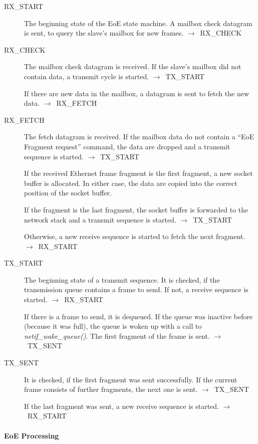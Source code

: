 \documentclass[a4paper,12pt,BCOR=6mm,bibtotoc,idxtotoc]{scrbook}
\begin{document}
\begin{description}
\item[RX\_START] The beginning state of the EoE state machine. A
  mailbox check datagram is sent, to query the slave's mailbox for new
  frames. $\rightarrow$~RX\_CHECK

\item[RX\_CHECK] The mailbox check datagram is received. If the
  slave's mailbox did not contain data, a transmit cycle is started.
  $\rightarrow$~TX\_START

  If there are new data in the mailbox, a datagram is sent to fetch
  the new data. $\rightarrow$~RX\_FETCH

\item[RX\_FETCH] The fetch datagram is received. If the mailbox data
  do not contain a ``EoE Fragment request'' command, the data are
  dropped and a transmit sequence is started.
  $\rightarrow$~TX\_START

  If the received Ethernet frame fragment is the first fragment, a new
  socket buffer is allocated. In either case, the data are copied into
  the correct position of the socket buffer.

  If the fragment is the last fragment, the socket buffer is forwarded
  to the network stack and a transmit sequence is started.
  $\rightarrow$~TX\_START

  Otherwise, a new receive sequence is started to fetch the next
  fragment. $\rightarrow$~RX\_\-START

\item[TX\_START] The beginning state of a transmit sequence. It is
  checked, if the transmission queue contains a frame to send. If not,
  a receive sequence is started. $\rightarrow$~RX\_START

  If there is a frame to send, it is dequeued. If the queue was
  inactive before (because it was full), the queue is woken up with a
  call to \textit{netif\_wake\_queue()}. The first fragment of the
  frame is sent. $\rightarrow$~TX\_SENT

\item[TX\_SENT] It is checked, if the first fragment was sent
  successfully. If the current frame consists of further fragments,
  the next one is sent. $\rightarrow$~TX\_SENT

  If the last fragment was sent, a new receive sequence is started.
  $\rightarrow$~RX\_START
\end{description}

\paragraph{EoE Processing}
\end{document}

